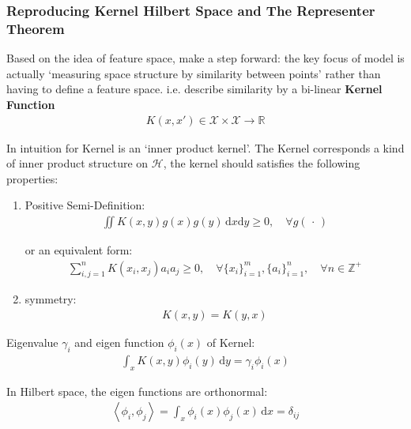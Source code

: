 \subsubsection{Reproducing Kernel Hilbert Space and The Representer Theorem}

    Based on the idea of feature space, make a step forward: the key focus of model is actually `measuring space structure by similarity between points' rather than having to define a feature space. i.e. describe similarity by a bi-linear \textbf{Kernel Function} 
    \begin{align*}\label{EqaKernelFunction}
        K(x,x') \in \mathcal{X}\times \mathcal{X}\to \mathbb{R}
    \end{align*}
        
    

    In intuition for Kernel is an `inner product kernel'. The Kernel corresponds a kind of inner product structure on $ \mathcal{H} $, the kernel should satisfies the following properties:
\begin{enumerate}[topsep=2pt,itemsep=2pt]
    \item Positive Semi-Definition:
    \begin{align}
        \iint K(x,y)g(x)g(y)\,\mathrm{d}x\mathrm{d}y\geq 0,\quad \forall g(\,\cdot\,)
    \end{align}
    
    or an equivalent form:
    \begin{align}
        \sum_{i,j=1}^n K(x_i,x_j)a_ia_j\geq 0,\quad \forall \{x_i\}_{i=1}^m,\{a_i\}_{i=1}^n,\quad \forall n\in\mathbb{Z}^+ 
    \end{align}
    \item symmetry:
    \begin{align}
        K(x,y)=K(y,x) 
    \end{align}
\end{enumerate}



Eigenvalue $ \gamma _i $ and eigen function $ \phi _i(x) $ of Kernel:
\begin{align}
     \int_x K(x,y) \phi _i(y)\,\mathrm{d}y=\gamma _i\phi_i(x)
\end{align}

    In Hilbert space, the eigen functions are orthonormal:
    \begin{align}
         \left\langle \phi _i,\phi _j\right\rangle = \int _x\phi _i(x)\phi _j(x) \,\mathrm{d}x =\delta _{ij}
    \end{align}

